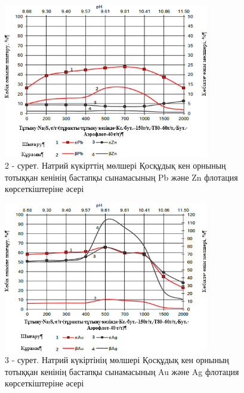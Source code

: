 \begin{figure}[H]
	\centering
	\includegraphics[width=0.8\textwidth]{media/gorn/image7}
	\caption*{2 - сурет. Натрий күкірттің мөлшері Қосқұдық кен орнының тотыққан кенінің бастапқы сынамасының Pb және Zn флотация көрсеткіштеріне әсері}
\end{figure}

\begin{figure}[H]
	\centering
	\includegraphics[width=0.8\textwidth]{media/gorn/image8}
	\caption*{3 - сурет. Натрий күкіртінің мөлшері Қосқұдық кен орнының тотыққан кенінің бастапқы сынамасының Au және Ag флотация көрсеткіштеріне әсері}
\end{figure}

